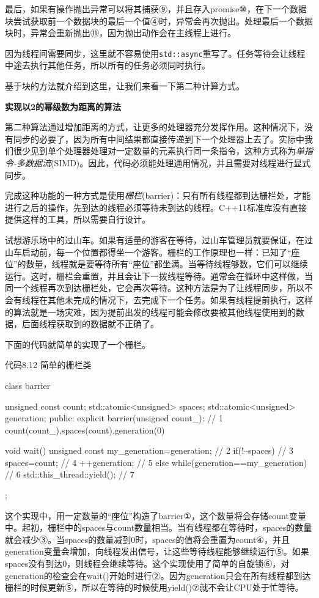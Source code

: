 最后，如果有操作抛出异常可以将其捕获⑨，并且存入promise⑩，在下一个数据块尝试获取前一个数据块的最后一个值④时，异常会再次抛出。处理最后一个数据块时，异常会重新抛出⑪，因为抛出动作会在主线程上进行。

因为线程间需要同步，这里就不容易使用\texttt{std::async}重写了。任务等待会让线程中途去执行其他任务，所以所有的任务必须同时执行。

基于块的方法就介绍到这里，让我们来看一下第二种计算方式。

\textbf{实现以2的幂级数为距离的算法}

第二种算法通过增加距离的方式，让更多的处理器充分发挥作用。这种情况下，没有同步的必要了，因为所有中间结果都直接传递到下一个处理器上去了。实际中我们很少见到单个处理器处理对一定数量的元素执行同一条指令，这种方式称为\textit{单指令-多数据流}(SIMD)。因此，代码必须能处理通用情况，并且需要对线程进行显式同步。

完成这种功能的一种方式是使用\textit{栅栏}(barrier)：只有所有线程都到达栅栏处，才能进行之后的操作，先到达的线程必须等待未到达的线程。C++11标准库没有直接提供这样的工具，所以需要自行设计。

试想游乐场中的过山车。如果有适量的游客在等待，过山车管理员就要保证，在过山车启动前，每一个位置都得坐一个游客。栅栏的工作原理也一样：已知了“座位”的数量，线程就是要等待所有“座位”都坐满。当等待线程够数，它们可以继续运行。这时，栅栏会重置，并且会让下一拨线程等待。通常会在循环中这样做，当同一个线程再次到达栅栏处，它会再次等待。这种方法是为了让线程同步，所以不会有线程在其他未完成的情况下，去完成下一个任务。如果有线程提前执行，这样的算法就是一场灾难，因为提前出发的线程可能会修改要被其他线程使用到的数据，后面线程获取到的数据就不正确了。

下面的代码就简单的实现了一个栅栏。

代码8.12 简单的栅栏类

\begin{cpp}
class barrier
{
  unsigned const count;
  std::atomic<unsigned> spaces;
  std::atomic<unsigned> generation;
public:
  explicit barrier(unsigned count_):  // 1
    count(count_),spaces(count),generation(0)
  {}

  void wait()
  {
    unsigned const my_generation=generation;  // 2
    if(!--spaces)  // 3
    {
      spaces=count;  // 4
      ++generation;  // 5
    }
    else
    {
      while(generation==my_generation)  // 6
        std::this_thread::yield();  // 7
    }
  }
};
\end{cpp}

这个实现中，用一定数量的“座位”构造了barrier①，这个数量将会存储count变量中。起初，栅栏中的spaces与count数量相当。当有线程都在等待时，spaces的数量就会减少③。当spaces的数量减到0时，spaces的值将会重置为count④，并且generation变量会增加，向线程发出信号，让这些等待线程能够继续运行⑤。如果spaces没有到达0，则线程会继续等待。这个实现使用了简单的自旋锁⑥，对generation的检查会在wait()开始时进行②。因为generation只会在所有线程都到达栅栏的时候更新⑤，所以在等待的时候使用yield()⑦就不会让CPU处于忙等待。


